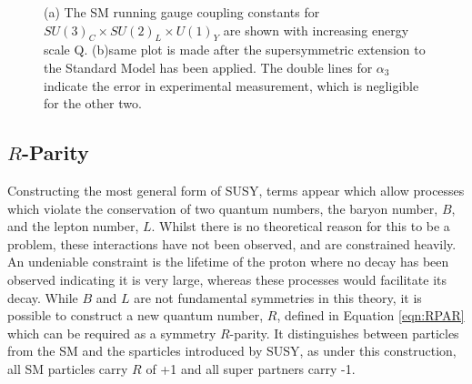 \begin{figure}
\centering
{}
\caption[The running gauge coupling constants for $SU(3)_{C} \times SU(2)_{L} \times U(1)_{Y}$ in the SM and SUSY cases.]{\label{fig:couple}(a) The SM running gauge coupling constants for $SU(3)_{C} \times SU(2)_{L} \times U(1)_{Y}$ are shown with increasing energy scale Q. (b)same plot is made after the supersymmetric extension to the Standard Model has been applied. The double lines for $\alpha_{3}$ indicate the error in experimental  measurement, which is negligible for the other two.~\cite{PeskinBSM}}
\end{figure}



\subsection{$R$-Parity}

Constructing the most general form of SUSY, terms appear which allow processes which violate the conservation of two quantum numbers, the baryon number, $B$, and the lepton number, $L$. Whilst there is no theoretical reason for this to be a problem, these interactions have not been observed, and are constrained heavily. An undeniable constraint is the lifetime of the proton where no decay has been observed indicating it is very large, whereas these processes would facilitate its decay. While $B$ and $L$ are not fundamental symmetries in this theory, it is possible to construct a new quantum number, $R$, defined in Equation \ref{eqn:RPAR} which can be required as a symmetry $R$-parity\cite{terning}. It distinguishes between particles from the SM and the sparticles introduced by SUSY, as under this construction, all SM particles carry $R$ of +1 and all super partners carry -1. 

